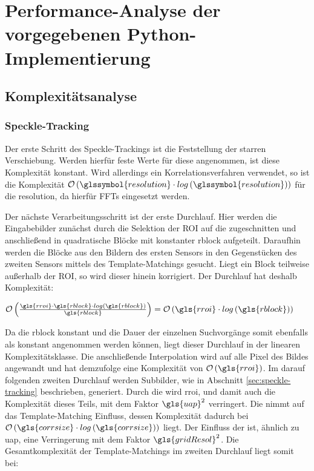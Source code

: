 \chapter{Performance-Analyse der vorgegebenen Python-Implementierung}

\section{Komplexitätsanalyse}

\subsection{Speckle-Tracking}

Der erste Schritt des Speckle-Trackings ist die Feststellung der starren Verschiebung. Werden hierfür feste Werte für diese angenommen, ist diese Komplexität konstant. Wird allerdings ein Korrelationsverfahren verwendet, so ist die Komplexität $\mathcal{O}\left(\glssymbol{resolution} \cdot log\left(\glssymbol{resolution}\right)\right)$ für die \gls{resolution}, da hierfür \glspl{FFT} eingesetzt werden. 

Der nächste Verarbeitungsschritt ist der erste Durchlauf. Hier werden die Eingabebilder zunächst durch die Selektion der \gls{ROI} auf die   zugeschnitten und anschließend in quadratische Blöcke mit konstanter \gls{rblock} aufgeteilt. Daraufhin werden die Blöcke aus den Bildern des ersten Sensors in den Gegenstücken des zweiten Sensors mittels des Template-Matchings gesucht. Liegt ein Block teilweise außerhalb der \gls{ROI}, so wird dieser hinein korrigiert. Der Durchlauf hat deshalb Komplexität: 

\begin{center}
	$\mathcal{O}\left(\frac{\gls{rroi} \cdot \gls{rblock} \cdot log\left(\gls{rblock}\right)}{\gls{rblock}}\right) = \mathcal{O}\left(\gls{rroi} \cdot log\left(\gls{rblock}\right)\right)$
\end{center}

Da die \gls{rblock} konstant und die Dauer der einzelnen Suchvorgänge somit ebenfalls als konstant angenommen werden können, liegt dieser Durchlauf in der linearen Komplexitätsklasse. Die anschließende Interpolation wird auf alle Pixel des Bildes angewandt und hat demzufolge eine Komplexität von $\mathcal{O}\left(\gls{rroi}\right)$. Im darauf folgenden zweiten Durchlauf werden Subbilder, wie in Abschnitt \ref{sec:speckle-tracking} beschrieben, generiert. Durch die   wird \gls{rroi}, und damit auch die Komplexität dieses Teils, mit dem Faktor $\gls{uap}^2$ verringert. Die   nimmt auf das Template-Matching Einfluss, dessen Komplexität dadurch bei $\mathcal{O}\left(\gls{corrsize} \cdot log\left(\gls{corrsize}\right)\right)$ liegt. Der Einfluss der   ist, ähnlich zu \gls{uap}, eine Verringerung mit dem Faktor $\gls{gridResol}^2$. Die Gesamtkomplexität der Template-Matchings im zweiten Durchlauf liegt somit bei:

